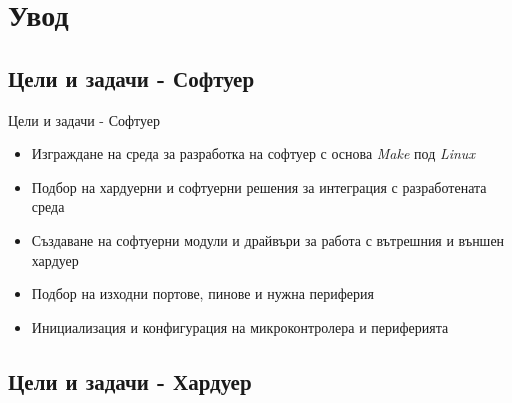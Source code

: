 \documentclass[handout]{beamer}
\title{\documenttitle}
\subtitle{}
\author{\documentauthorname}
\institute{Технически Университет София}
\date{25 Февруари 2022}
\begin{document}
	
\begin{frame}
	\begin{nohyphens}
	\maketitle %
	\end{nohyphens}
\end{frame}


\section{Увод} 

\subsection{Цели и задачи - Софтуер}


\begin{frame}{Цели и задачи - Софтуер}
	\begin{itemize}
		\pause 
		\item Изграждане на среда за разработка на софтуер с основа \textit{Make} под \textit{Linux}

		\pause 
		\item Подбор на хардуерни и софтуерни решения за интеграция с разработената среда

		\pause 
		\item Създаване на софтуерни модули и драйвъри за работа с вътрешния и външен хардуер

		\pause 
		\item Подбор на изходни портове, пинове и нужна периферия

		\pause
		\item Инициализация и конфигурация на микроконтролера и периферията 

	\end{itemize}
\end{frame}

\subsection{Цели и задачи - Хардуер}
\end{document}
